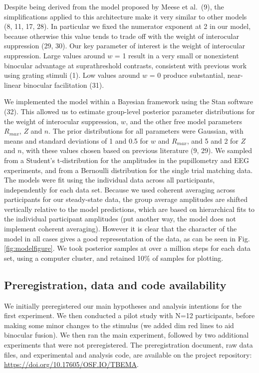 \documentclass[
]{article}
\begin{document}
Despite being derived from the model proposed by Meese et al.~(9), the simplifications applied to this architecture make it very similar to other models (8, 11, 17, 28). In particular we fixed the numerator exponent at 2 in our model, because otherwise this value tends to trade off with the weight of interocular suppression (29, 30). Our key parameter of interest is the weight of interocular suppression. Large values around \(w\) = 1 result in a very small or nonexistent binocular advantage at suprathreshold contrasts, consistent with previous work using grating stimuli (1). Low values around \(w\) = 0 produce substantial, near-linear binocular facilitation (31).

We implemented the model within a Bayesian framework using the Stan software (32). This allowed us to estimate group-level posterior parameter distributions for the weight of interocular suppression, \(w\), and the other free model parameters \(R_{max}\), \(Z\) and \(n\). The prior distributions for all parameters were Gaussian, with means and standard deviations of 1 and 0.5 for \(w\) and \(R_{max}\), and 5 and 2 for \(Z\) and \(n\), with these values chosen based on previous literature (9, 29). We sampled from a Student's t-distribution for the amplitudes in the pupillometry and EEG experiments, and from a Bernoulli distribution for the single trial matching data. The models were fit using the individual data across all participants, independently for each data set. Because we used coherent averaging across participants for our steady-state data, the group average amplitudes are shifted vertically relative to the model predictions, which are based on hierarchical fits to the individual participant amplitudes (put another way, the model does not implement coherent averaging). However it is clear that the character of the model in all cases gives a good representation of the data, as can be seen in Fig. \ref{fig:modelfigure}. We took posterior samples at over a million steps for each data set, using a computer cluster, and retained 10\% of samples for plotting.

\hypertarget{preregistration-data-and-code-availability}{%
\subsection{Preregistration, data and code availability}\label{preregistration-data-and-code-availability}}

We initially preregistered our main hypotheses and analysis intentions for the first experiment. We then conducted a pilot study with N=12 participants, before making some minor changes to the stimulus (we added dim red lines to aid binocular fusion). We then ran the main experiment, followed by two additional experiments that were not preregistered. The preregistration document, raw data files, and experimental and analysis code, are available on the project repository: \url{https://doi.org/10.17605/OSF.IO/TBEMA}.
\end{document}
